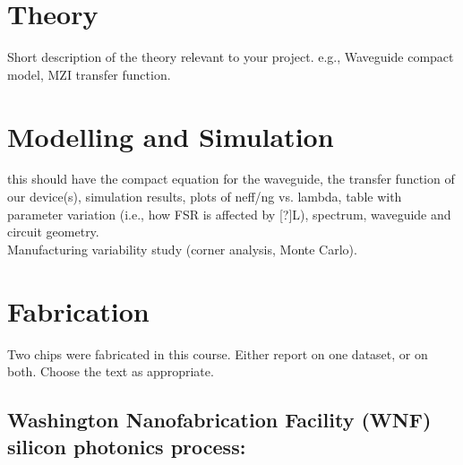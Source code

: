 \section{Theory}\label{auto-label-section-246679}

Short description of the theory relevant to your project. e.g.,
Waveguide compact model, MZI transfer function. ~\\

\section{Modelling and Simulation}\label{auto-label-section-848662}

this should have the compact equation for the waveguide, the transfer
function of our device(s), simulation results, plots of neff/ng vs.
lambda, table with parameter variation (i.e., how FSR is affected by
[?]L), spectrum, waveguide and circuit geometry.\\

Manufacturing variability study (corner analysis, Monte Carlo).\\

\section{Fabrication}\label{fabrication}

Two chips were fabricated in this course. Either report on one dataset,
or on both. Choose the text as appropriate.\\

\subsection{Washington Nanofabrication Facility (WNF) silicon photonics
process:}\label{auto-label-subsection-771002}

